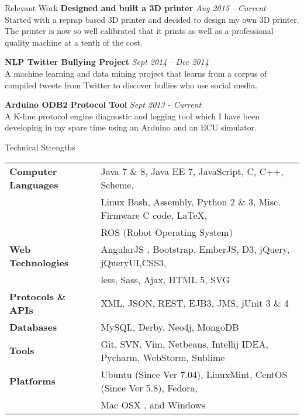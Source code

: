 \documentclass{resume} %
\begin{document}
\begin{rSection}{Relevant Work}
{\bf Designed and built a 3D printer} \hfill {\em Aug 2015 - Current} \\ 
Started with a reprap based 3D printer and decided to design my own 3D printer. The printer is now so well calibrated that it prints as well as a professional quality machine at a tenth of the cost.

{\bf NLP Twitter Bullying Project} \hfill {\em Sept 2014 - Dec 2014} \\ 
A machine learning and data mining project that learns from a corpus of compiled tweets from Twitter to discover bullies who use social media.

{\bf Arduino ODB2 Protocol Tool} \hfill {\em Sept 2013 - Current} \\ 
A K-line protocol engine diagnostic and logging tool which I have been developing in my spare time using an Arduino and an ECU simulator.  \smallskip \\

\end{rSection}



\begin{rSection}{Technical Strengths}

\begin{tabular}{ @{} >{\bfseries}l @{\hspace{6ex}} l }
Computer Languages & Java 7 \& 8, Java EE 7, JavaScript, C, C++,  Scheme,\\
 					&  Linux Bash, Assembly, Python 2 \& 3, Misc. Firmware C code, \LaTeX,\\
 					&  ROS (Robot Operating System) \\
Web Technologies & AngularJS , Bootstrap, EmberJS, D3, jQuery, jQueryUI,CSS3,\\
				&  less, Sass, Ajax, HTML 5, SVG \\	
Protocols \& APIs & XML, JSON,  REST, EJB3, JMS, jUnit 3 \& 4 \\
         Databases & MySQL, Derby, Neo4j, MongoDB \\
			 Tools & Git, SVN, Vim, Netbeans, Intellij IDEA, Pycharm, WebStorm, Sublime \\
		 Platforms & Ubuntu (Since Ver 7.04), LinuxMint, CentOS (Since Ver 5.8), Fedora, \\
 & Mac OSX , and Windows \\
\end{tabular}

\end{rSection}
\end{document}
